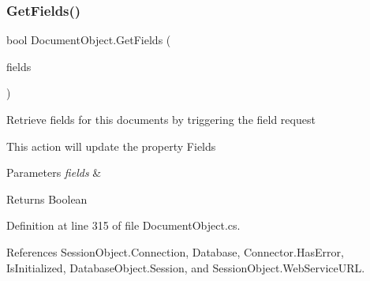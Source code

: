 \subsubsection{\texorpdfstring{Get\+Fields()}{GetFields()}\hspace{0.1cm}{\footnotesize\ttfamily [2/2]}}
{\footnotesize\ttfamily bool Document\+Object.\+Get\+Fields (\begin{DoxyParamCaption}\item[{I\+List}]{fields }\end{DoxyParamCaption})}



Retrieve fields for this documents by triggering the field request 

This action will update the property \textquotesingle{}Fields\textquotesingle{}


\begin{DoxyParams}{Parameters}
{\em fields} & \\
\hline
\end{DoxyParams}
\begin{DoxyReturn}{Returns}
Boolean
\end{DoxyReturn}


Definition at line 315 of file Document\+Object.\+cs.



References Session\+Object.\+Connection, Database, Connector.\+Has\+Error, Is\+Initialized, Database\+Object.\+Session, and Session\+Object.\+Web\+Service\+U\+RL.


